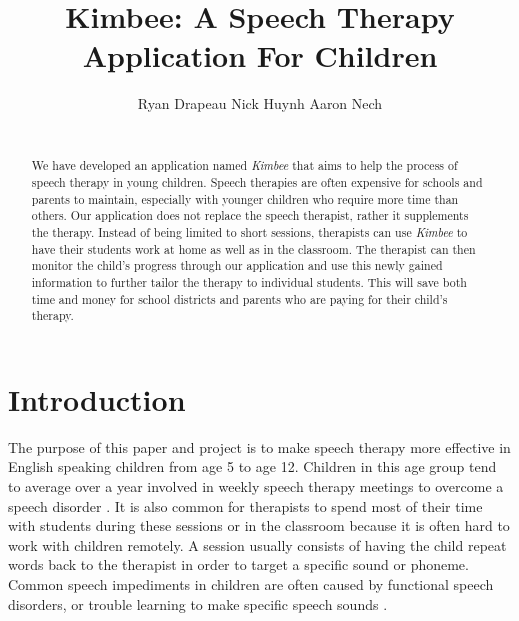 \documentclass{sig-alternate-2013}
\begin{document}
\title{Kimbee: A Speech Therapy Application For Children}

\author{
    \alignauthor
    \vspace*{-0.3in}
        Ryan Drapeau \hspace{3.0cm}
        Nick Huynh \hspace{3.0cm}
        Aaron Nech \\
     \\[3 pt]
}

\maketitle

\begin{abstract}

We have developed an application named {\em Kimbee} that aims to help the process of speech therapy in young children. Speech therapies are often expensive for schools and parents to maintain, especially with younger children who require more time than others. Our application does not replace the speech therapist, rather it supplements the therapy. Instead of being limited to short sessions, therapists can use {\em Kimbee} to have their students work at home as well as in the classroom. The therapist can then monitor the child's progress through our application and use this newly gained information to further tailor the therapy to individual students. This will save both time and money for school districts and parents who are paying for their child's therapy.

\end{abstract}

\section{Introduction}

The purpose of this paper and project is to make speech therapy more effective in English speaking children from age 5 to age 12. Children in this age group tend to average over a year involved in weekly speech therapy meetings to overcome a speech disorder \cite{Kreider:Intro}. It is also common for therapists to spend most of their time with students during these sessions or in the classroom because it is often hard to work with children remotely. A session usually consists of having the child repeat words back to the therapist in order to target a specific sound or phoneme. Common speech impediments in children are often caused by functional speech disorders, or trouble learning to make specific speech sounds \cite{Brown:Children}.
\end{document}
